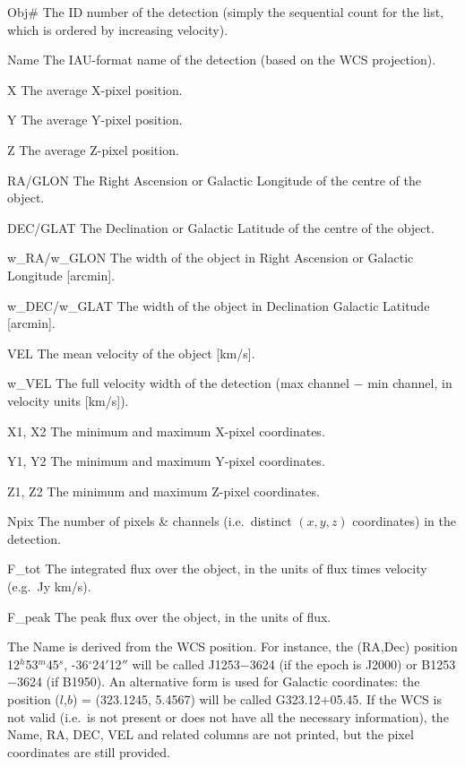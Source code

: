 \documentclass[12pt,a4paper]{article}
\newcommand{\eg}{e.g.\ }
\newcommand{\ie}{i.e.\ }
\newcommand{\entrylabel}[1]{\mbox{\textsf{\bf{#1:}}}\hfil}
\newenvironment{entry}
        {\begin{list}{}%
                {\renewcommand{\makelabel}{\entrylabel}%
                        \setlength{\labelwidth}{30mm}%
                        \setlength{\labelsep}{5pt}%
                        \setlength{\itemsep}{2pt}%
                        \setlength{\parsep}{2pt}%
                        \setlength{\leftmargin}{35mm}%
                }%
        }%
{\end{list}}
\begin{document}
\begin{entry}
\item[Obj\#] The ID number of the detection (simply the sequential
  count for the list, which is ordered by increasing velocity).
\item[Name] The IAU-format name of the detection (based on the WCS
  projection).
\item[X] The average X-pixel position.
\item[Y] The average Y-pixel position.
\item[Z] The average Z-pixel position.
\item[RA/GLON] The Right Ascension or Galactic Longitude of the centre
of the object.
\item[DEC/GLAT] The Declination or Galactic Latitude of the centre of
the object.
\item[w\_RA/w\_GLON] The width of the object in Right Ascension or
Galactic Longitude [arcmin].
\item[w\_DEC/w\_GLAT] The width of the object in Declination Galactic
  Latitude [arcmin].
\item[VEL] The mean velocity of the object [km/s].
\item[w\_VEL] The full velocity width of the detection (max channel
  $-$ min channel, in velocity units [km/s]).
\item[X1, X2] The minimum and maximum X-pixel coordinates.
\item[Y1, Y2] The minimum and maximum Y-pixel coordinates.
\item[Z1, Z2] The minimum and maximum Z-pixel coordinates.
\item[Npix] The number of pixels \& channels (\ie distinct $(x,y,z)$
  coordinates) in the detection.
\item[F\_tot] The integrated flux over the object, in the units of
  flux times velocity (\eg Jy km/s).
\item[F\_peak] The peak flux over the object, in the units of flux.
\end{entry}
The Name is derived from the WCS position. For instance, the (RA,Dec)
position 12$^h$53$^m$45$^s$, -36$^\circ$24$'$12$''$ will be called
J1253$-$3624 (if the epoch is J2000) or B1253$-$3624 (if B1950). An
alternative form is used for Galactic coordinates: the position
($l$,$b$) = (323.1245, 5.4567) will be called G323.12$+$05.45. If the
WCS is not valid (\ie is not present or does not have all the
necessary information), the Name, RA, DEC, VEL and related columns are
not printed, but the pixel coordinates are still provided.
\end{document}
